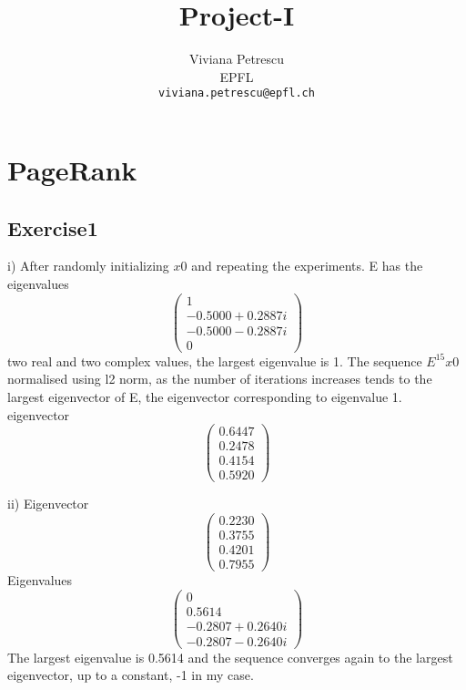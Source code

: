 \documentclass{article} %
\title{Project-I}
\author{
Viviana Petrescu\\
EPFL \\
\texttt{viviana.petrescu@epfl.ch} \\
}
\begin{document}
\maketitle


\section{PageRank}

\subsection{Exercise1}
i) After randomly initializing $x0$ and repeating the experiments.
E has the eigenvalues \[ \left( \begin{array}{c}
1\\
 -0.5000 + 0.2887i \\
  -0.5000 - 0.2887i \\
0 \end{array} \right)\]  two real and two complex values,
the largest eigenvalue is 1. The sequence $E^15x0$ normalised using l2 norm, as the number of iterations increases tends to the largest eigenvector of E, the eigenvector corresponding to eigenvalue 1. eigenvector   \[ \left( \begin{array}{c} 
   0.6447\\
    0.2478\\
    0.4154\\
    0.5920\end{array} \right)\] 

ii)   Eigenvector \[ \left( \begin{array}{c}  
	    0.2230\\
    0.3755\\
    0.4201\\
    0.7955\end{array} \right)\] 
    Eigenvalues
  \[ \left( \begin{array}{c}            
  0          \\
   0.5614   \\       
  -0.2807 + 0.2640i\\
  -0.2807 - 0.2640i\end{array} \right)\] 
The largest eigenvalue is 0.5614 and the sequence converges again to the largest eigenvector, up to a constant, -1 in my case.
\end{document}
